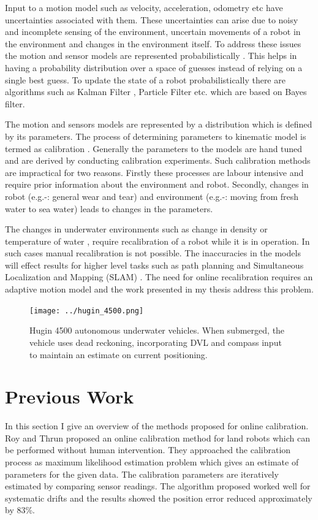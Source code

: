 \documentclass[12pt]{dalcsthesis}
\begin{document}
Input to a motion model such as velocity, acceleration, odometry etc have uncertainties associated with them. These uncertainties can arise due to noisy and incomplete sensing of the environment, uncertain movements of a robot in the environment and changes in the environment itself. To address these issues the motion and sensor models are represented probabilistically \cite{thrun2005probabilistic}. This helps in having a probability distribution over a space of guesses instead of relying on a single best guess. To update the state of a robot probabilistically there are algorithms such as Kalman Filter \cite{kalman1960new}, Particle Filter \cite{gordon1993novel} etc. which are based on Bayes filter. 

The motion and sensors models are represented by a distribution which is defined by its parameters.  The process of determining parameters to kinematic model is termed as calibration \cite{cox1990autonomous}  \cite{vukobratovic1989introduction}. Generally the parameters to the models are hand tuned and are derived by conducting calibration experiments. Such calibration methods are impractical for two reasons. Firstly these processes are labour intensive and require prior information about the environment and robot. Secondly, changes in robot (e.g.-:  general wear and tear) and environment (e.g.-: moving from fresh water to sea water) leads to changes in the parameters.

The changes in underwater environments such as change in density or temperature of water , require recalibration of a robot while it is in operation. In such cases manual recalibration is not possible. The inaccuracies in the models will effect results for higher level tasks such as path planning \cite{Lav06} and Simultaneous Localization and Mapping (SLAM) \cite{thrun2005probabilistic} \cite{grisettiyz2005improving}. The need for online recalibration requires an adaptive motion model and the work presented in my thesis address this problem.


\begin{figure}
  \centering
     {\texttt{[image: ../hugin\_4500.png]}}
  \caption{\label{fig-Hugin 4500} Hugin 4500 autonomous underwater vehicles. When submerged, the vehicle uses dead reckoning, incorporating DVL and compass input to maintain an estimate on current positioning.
}
\end{figure}




\section{Previous Work}
In this section I give an overview of the methods proposed for online calibration. Roy and Thrun \cite{Roy} proposed an online calibration method for land robots which can be performed without human intervention.  They approached the calibration process as maximum likelihood estimation problem which gives an estimate of parameters for the given data. The calibration parameters are iteratively estimated by comparing sensor readings. The algorithm proposed worked well for systematic drifts and the results showed the position error reduced approximately by 83\%.
\end{document}
